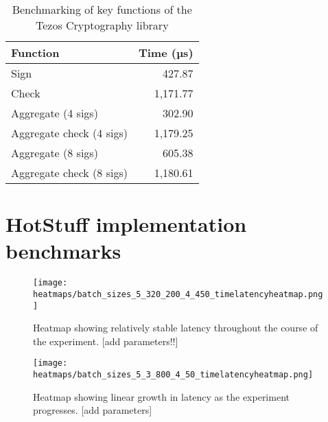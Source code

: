 \begin{table}[!h]
	\centering
	\begin{tabular}{|l|r|}
	\hline
	Function                 & Time (µs) \\ \hline
	Sign                     & 427.87   \\
	Check                    & 1,171.77 \\
	Aggregate (4 sigs)       & 302.90   \\
	Aggregate check (4 sigs) & 1,179.25 \\
	Aggregate (8 sigs)       & 605.38   \\
	Aggregate check (8 sigs) & 1,180.61 \\ \hline
	\end{tabular}
	\caption{Benchmarking of key functions of the Tezos Cryptography library}
\end{table}

\section{HotStuff implementation benchmarks} \label{hotstuffbenchmarks}

\begin{figure}[h!]
\centering
\texttt{[image: heatmaps/batch\_sizes\_5\_320\_200\_4\_450\_timelatencyheatmap.png]}
\caption{Heatmap showing relatively stable latency throughout the course of the experiment. [add parameters!!]}
\label{stableheatmap}
\end{figure}

\begin{figure}[h!]
\centering
\texttt{[image: heatmaps/batch\_sizes\_5\_3\_800\_4\_50\_timelatencyheatmap.png]}
\caption{Heatmap showing linear growth in latency as the experiment progresses. [add parameters]}
\label{linearheatmap}
\end{figure}

